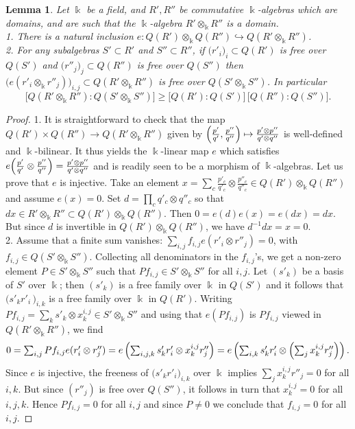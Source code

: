 \documentclass[11pt]{amsart}
\newtheorem{lem}[teo]{Lemma}
\begin{document}
\begin{lem}\label{lemmaSupMultDim}
Let $\Bbbk$ be a field, and $R',R''$ be commutative $\Bbbk$-algebras which are domains, and are such that the $\Bbbk$-algebra $R' \otimes_\Bbbk R''$ is a domain.
\\1. There is a natural inclusion $e : Q(R') \otimes_\Bbbk Q(R'') \hookrightarrow Q(R' \otimes_\Bbbk R'')$.
\\2. For any  subalgebras $S' \subset R'$ and $S'' \subset R''$, if $\bigl(r'_i\bigr)_i \subset Q(R')$ is free over $Q(S')$ and $\bigl(r''_j\bigr)_j \subset Q(R'')$ is free over $Q(S'')$ then $\bigl(e(r'_i \otimes_\Bbbk r''_j) \bigr)_{i,j} \subset Q(R' \otimes_\Bbbk R'')$ is free over $Q(S' \otimes_\Bbbk S'')$. In particular
\[ \bigl[ Q(R' \otimes_\Bbbk R'') : Q(S' \otimes_\Bbbk S'') \bigr] \geq \bigl[ Q(R') : Q(S') \bigr] \, \bigl[ Q(R'') : Q(S'') \bigr]. \]
\end{lem}
\begin{proof}
1. It is straightforward to check that the map $Q(R') \times Q(R'') \to Q(R' \otimes_\Bbbk R'')$ given by $\Bigl(\frac{p'}{q'}, \frac{p''}{q''} \Bigr) \mapsto \frac{p' \otimes p''}{q' \otimes q''}$ is well-defined and $\Bbbk$-bilinear. It thus yields the $\Bbbk$-linear map $e$ which satisfies $e\Bigl(\frac{p'}{q'} \otimes \frac{p''}{q''}\Bigr) = \frac{p' \otimes p''}{q' \otimes q''}$ and is readily seen to be a morphism of $\Bbbk$-algebras. Let us prove that $e$ is injective. Take an element $x = \sum_{c} \frac{p'_c}{q'_c} \otimes \frac{p''_c}{q''_c} \in Q(R') \otimes_\Bbbk Q(R'')$ and assume $e(x)=0$. Set $d = \textstyle \prod_c q'_c \otimes q''_c$ so that $dx \in R' \otimes_\Bbbk R'' \subset Q(R') \otimes_\Bbbk Q(R'')$. Then $ 0 = e(d)e(x) = e(dx) = dx$. But since $d$ is invertible in $Q(R') \otimes_\Bbbk Q(R'')$, we have $d^{-1}dx = x = 0$.
\\2. Assume that a finite sum vanishes: $\textstyle \sum_{i,j} f_{i,j} e(r'_i \otimes r''_j) = 0$, with $f_{i,j} \in Q(S' \otimes_\Bbbk S'')$. Collecting all denominators in the $f_{i,j}$'s, we get a non-zero element $P \in S' \otimes_\Bbbk S''$ such that $Pf_{i,j} \in S' \otimes_\Bbbk S''$ for all $i,j$. Let $(s'_k)$ be a basis of $S'$ over $\Bbbk$; then $(s'_k)$ is a free family over $\Bbbk$ in $Q(S')$ and it follows that $\bigl( s'_k r'_i \,\bigr)_{i,k}$ is a free family over $\Bbbk$ in $Q(R')$. Writing $Pf_{i,j} = \textstyle \sum_k s'_k \otimes x^{i,j}_k \in S' \otimes_\Bbbk S''$ and using that $e(Pf_{i,j})$ is $Pf_{i,j}$ viewed in $Q(R' \otimes_\Bbbk R'')$, we find
\[ \textstyle 0 = \sum_{i,j} Pf_{i,j} e(r'_i \otimes r''_j) = e\left(\sum_{i,j,k} s'_k r'_i \otimes x^{i,j}_k r''_j \right) = e\left( \sum_{i,k} s'_k r'_i \otimes \Bigl( \sum_j x^{i,j}_k r''_j \Bigr) \right).  \]
Since $e$ is injective, the freeness of $\bigl( s'_k r'_i \bigr)_{i,k}$ over $\Bbbk$ implies $\textstyle \sum_j x^{i,j}_k r''_j = 0$ for all $i,k$. But since $(r''_j)$ is free over $Q(S'')$, it follows in turn that $x^{i,j}_k=0$ for all $i,j,k$. Hence $Pf_{i,j} = 0$ for all $i,j$ and since $P \neq 0$ we conclude that $f_{i,j} = 0$ for all $i,j$.
\end{proof}
\end{document}
